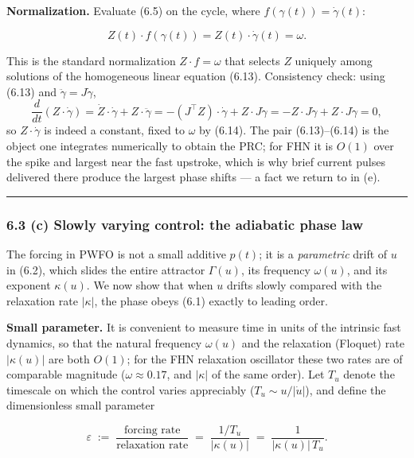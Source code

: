 \documentclass[
  11pt,
]{article}
\begin{document}
\textbf{Normalization.} Evaluate (6.5) on the cycle, where
\(f(\gamma(t))=\dot\gamma(t)\):

\[
Z(t)\cdot f(\gamma(t))=Z(t)\cdot\dot\gamma(t)=\omega .
\tag{6.14}
\]

This is the standard normalization \(Z\cdot f=\omega\) that selects
\(Z\) uniquely among solutions of the homogeneous linear equation
(6.13). Consistency check: using (6.13) and \(\ddot\gamma=J\dot\gamma\),
\[
\frac{d}{dt}(Z\cdot\dot\gamma)=\dot Z\cdot\dot\gamma+Z\cdot\ddot\gamma
=-(J^{\!\top}Z)\cdot\dot\gamma+Z\cdot J\dot\gamma
=-Z\cdot J\dot\gamma+Z\cdot J\dot\gamma=0,
\] so \(Z\cdot\dot\gamma\) is indeed a constant, fixed to \(\omega\) by
(6.14). The pair (6.13)--(6.14) is the object one integrates numerically
to obtain the PRC; for FHN it is \(O(1)\) over the spike and largest
near the fast upstroke, which is why brief current pulses delivered
there produce the largest phase shifts --- a fact we return to in (e).

\begin{center}\rule{0.5\linewidth}{0.5pt}\end{center}

\subsubsection{6.3 (c) Slowly varying control: the adiabatic phase
law}\label{c-slowly-varying-control-the-adiabatic-phase-law}

The forcing in PWFO is not a small additive \(p(t)\); it is a
\emph{parametric} drift of \(u\) in (6.2), which slides the entire
attractor \(\Gamma(u)\), its frequency \(\omega(u)\), and its exponent
\(\kappa(u)\). We now show that when \(u\) drifts slowly compared with
the relaxation rate \(|\kappa|\), the phase obeys (6.1) exactly to
leading order.

\textbf{Small parameter.} It is convenient to measure time in units of
the intrinsic fast dynamics, so that the natural frequency \(\omega(u)\)
and the relaxation (Floquet) rate \(|\kappa(u)|\) are both \(O(1)\); for
the FHN relaxation oscillator these two rates are of comparable
magnitude (\(\omega\approx0.17\), and \(|\kappa|\) of the same order).
Let \(T_u\) denote the timescale on which the control varies appreciably
(\(T_u\sim u/|\dot u|\)), and define the dimensionless small parameter

\[
\varepsilon\;:=\;\frac{\text{forcing rate}}{\text{relaxation rate}}\;=\;\frac{1/T_u}{|\kappa(u)|}\;=\;\frac{1}{|\kappa(u)|\,T_u}.
\tag{6.15}
\]
\end{document}
